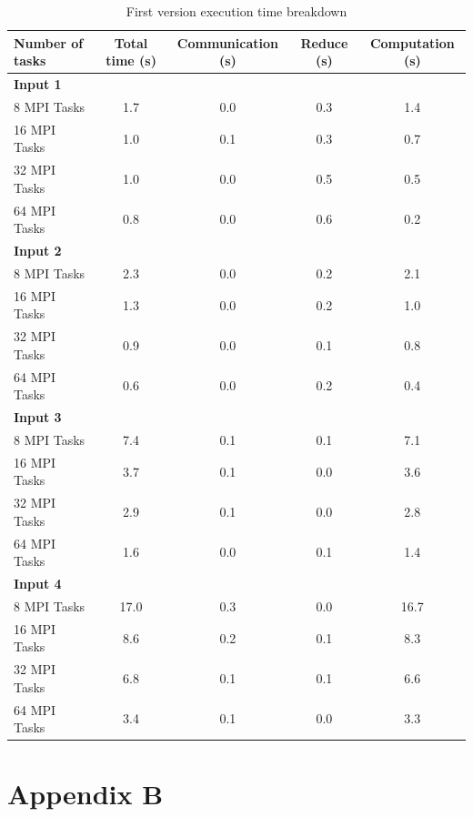 \documentclass{article}
\begin{document}
\begin{table}[htbp]
  \centering
  \label{tab:mpi_performance}
  \begin{tabular}{lcccc}
    \toprule
    \textbf{Number of tasks} & \textbf{Total time (s)} & \textbf{Communication (s)} & \textbf{Reduce (s)} & \textbf{Computation (s)} \\
    \midrule
    \textbf{Input 1} & & & & \\
    8 MPI Tasks & 1.7 & 0.0 & 0.3 & 1.4 \\
    16 MPI Tasks & 1.0 & 0.1 & 0.3 & 0.7 \\
    32 MPI Tasks & 1.0 & 0.0 & 0.5 & 0.5 \\
    64 MPI Tasks & 0.8 & 0.0 & 0.6 & 0.2 \\
    \midrule
    \textbf{Input 2} & & & & \\
    8 MPI Tasks & 2.3 & 0.0 & 0.2 & 2.1 \\
    16 MPI Tasks & 1.3 & 0.0 & 0.2 & 1.0 \\
    32 MPI Tasks & 0.9 & 0.0 & 0.1 & 0.8 \\
    64 MPI Tasks & 0.6 & 0.0 & 0.2 & 0.4 \\
    \midrule
    \textbf{Input 3} & & & & \\
    8 MPI Tasks & 7.4 & 0.1 & 0.1 & 7.1 \\
    16 MPI Tasks & 3.7 & 0.1 & 0.0 & 3.6 \\
    32 MPI Tasks & 2.9 & 0.1 & 0.0 & 2.8 \\
    64 MPI Tasks & 1.6 & 0.0 & 0.1 & 1.4 \\
    \midrule
    \textbf{Input 4} & & & & \\
    8 MPI Tasks & 17.0 & 0.3 & 0.0 & 16.7 \\
    16 MPI Tasks & 8.6 & 0.2 & 0.1 & 8.3 \\
    32 MPI Tasks & 6.8 & 0.1 & 0.1 & 6.6 \\
    64 MPI Tasks & 3.4 & 0.1 & 0.0 & 3.3 \\
    \bottomrule
  \end{tabular}
  \caption{First version execution time breakdown}
\end{table}

\newpage

\section{Appendix B}
\end{document}
